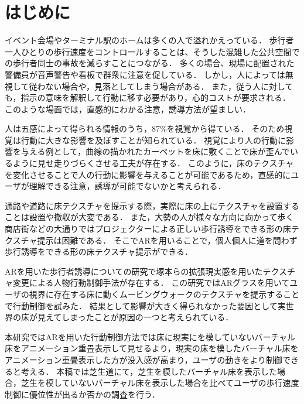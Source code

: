 \documentclass[dvipdfmx]{jsarticle}
\begin{document}

\vspace{3mm}

\section{はじめに}
イベント会場やターミナル駅のホームは多くの人で溢れかえっている．
歩行者一人ひとりの歩行速度をコントロールすることは、そうした混雑した公共空間での歩行者同士の事故を減らすことにつながる．
多くの場合、現場に配置された警備員が音声警告や看板で群衆に注意を促している．
しかし，人によっては無視して従わない場合や，見落としてしまう場合がある．
また，従う人に対しても，指示の意味を解釈して行動に移す必要があり，心的コストが要求される．
このような場面では，直感的にわかる注意，誘導方法が望ましい．


人は五感によって得られる情報のうち，87\%を視覚から得ている\cite{book1}．
そのため視覚は行動に大きな影響を及ぼすことが知られている．
視覚により人の行動に影響を与える例として，曲線の描かれたカーペットを床に敷くことで床が歪んでいるように見せ走りづらくさせる工夫が存在する\cite{webpage1}．
このように，床のテクスチャを変化させることで人の行動に影響を与えることが可能であるため，直感的にユーザが理解できる注意，誘導が可能でないかと考えられる．


通路や道路に床テクスチャを提示する際，実際に床の上にテクスチャを設置することは設置や撤収が大変である．
また，大勢の人が様々な方向に向かって歩く商店街などの大通りではプロジェクターによる正しい歩行誘導をできる形の床テクスチャ提示は困難である．
そこでARを用いることで，個人個人に道を問わず歩行誘導をできる形の床テクスチャ提示ができる．


ARを用いた歩行者誘導についての研究で塚本らの拡張現実感を用いたテクスチャ変更による人物行動制御手法が存在する．
この研究ではARグラスを用いてユーザの視界に存在する床に動くムービングウォークのテクスチャを提示することで行動制御を試みた．
結果として影響が大きく得られなかった要因として実世界の床が見えてしまったことが原因の一つと考えられている\cite{article1}．


本研究ではARを用いた行動制御方法では床に現実にを模していないバーチャル床をアニメーション重畳表示して見せるより，現実の床を模したバーチャル床をアニメーション重畳表示した方が没入感が高まり，ユーザの動きをより制御できると考える．
本稿では芝生道にて，芝生を模したバーチャル床を表示した場合，芝生を模していないバーチャル床を表示した場合を比べてユーザの歩行速度制御に優位性が出るか否かの調査を行う．
\end{document}
